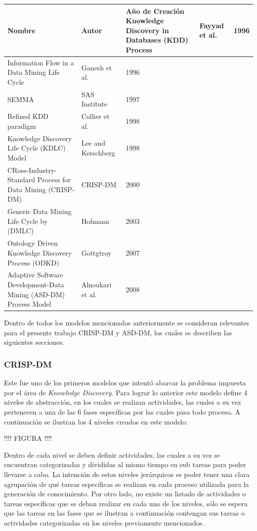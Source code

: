 \begin{tabularx}{\linewidth}{@{}Y  Y  Y  Y@{}}
  \caption{Modelos a lo largo de la historia de \textit{KDP}} \label{tab:kdp_models}\\
  \toprule
  Nombre	&	Autor	&	Año de Creación
  \endhead
  \midrule
  Knowledge Discovery in Databases (KDD) Process & Fayyad et al. & 1996 \\
  \midrule
  Information Flow in a Data Mining Life Cycle & Ganesh et al. & 1996 \\
  \midrule
  SEMMA & SAS Institute & 1997 \\
  \midrule
  Refined KDD paradigm & Collier et al. & 1998 \\
  \midrule
  Knowledge Discovery Life Cycle (KDLC) Model & Lee and Kerschberg & 1998 \\
  \midrule
  CRoss-Industry-Standard Process for Data Mining (CRISP-DM) & CRISP-DM & 2000 \\
  \midrule
  Generic Data Mining Life Cycle by (DMLC) & Hofmann & 2003 \\
  \midrule
  Ontology Driven Knowledge Discovery Process (ODKD) & Gottgtroy & 2007 \\
  \midrule
  Adaptive Software Development-Data Mining (ASD-DM) Process Model & Alnoukari et al. & 2008 \\
\end{tabularx}

Dentro de todos los modelos mencionados anteriormente se consideran relevantes para el presente trabajo CRISP-DM y ASD-DM, los cuales se describen las siguientes secciones.

\subsubsection{CRISP-DM \label{crip_dm}}
Este fue uno de los primeros modelos que intentó abarcar la problema impuesta por el área de \textit{Knowledge Discovery}. Para lograr lo anterior este modelo define 4 niveles de abstracción, en los cuales se realizan actividades, las cuales a su vez pertenecen a una de las 6 fases específicas por las cuales pasa todo proceso. A continuación se ilustran los 4 niveles creados en este modelo:

!!!! FIGURA !!!!

Dentro de cada nivel se deben definir actividades, las cuales a su vez se encuentran categorizadas y divididas al mismo tiempo en sub tareas para poder llevarse a cabo. La intención de estos niveles jerárquicos es poder tener una clara agrupación de qué tareas específicas se realizan en cada proceso utilizada para la generación de conocimiento. Por otro lado, no existe un listado de actividades o tareas específicas que se deban realizar en cada uno de los niveles, sólo se espera que las tareas en las fases que se ilustran a continuación contengan sus tareas o actividades categorizadas en los niveles previamente mencionados.


